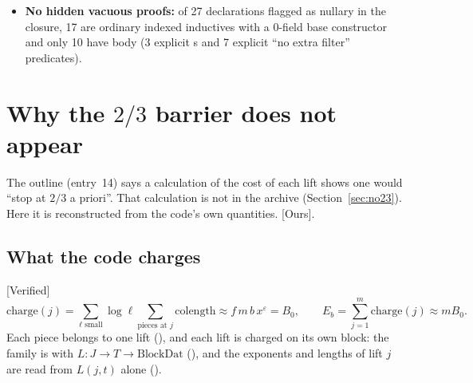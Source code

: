 \documentclass[11pt]{article}
\newcommand{\Verified}{\textcolor{verc}{\textsf{\small[Verified]}}}
\newcommand{\Ours}{\textcolor{oursc}{\textsf{\small[Ours]}}}
\newcommand{\eps}{\varepsilon}
\theoremstyle{plain}
\theoremstyle{definition}
\begin{document}
\begin{itemize}
  (, , , $\sim$1{,}645 declarations,
  unread field  / ; upstream PR~\#384);
  (ii)~the  / Hodge-flag / Pl\"ucker conjunct ($\sim$160+ declarations, unread 4th
  conjunct of ; PR~\#395);
  (iii)~12 classical-theorem fields of  (including
  Stone--von Neumann, metaplectic representation, Kudla splitting, holomorphic discrete series,
  Weyl branching, and cuspidal mirabolic; $\sim$800+ declarations; PR~\#398); or
  (iv)~the full local Langlands correspondence ( is inert; the proof uses
  only the weak assignment  via ).
\item \textbf{No hidden vacuous proofs:} of 27  declarations flagged as nullary in the
  closure, 17 are ordinary indexed inductives with a 0-field base constructor and only 10 have body
   (3 explicit s and 7 explicit ``no extra filter'' predicates).
\end{itemize}

\section{Why the $2/3$ barrier does not appear}\label{sec:23}

The outline (entry~14) says a calculation of the cost of each lift shows one would ``stop at $2/3$ a
priori''. That calculation is not in the archive (Section~\ref{sec:no23}). Here it is reconstructed
from the code's own quantities. \Ours.

\subsection{What the code charges}

\Verified{}
\[
\mathrm{charge}(j)=\sum_{\ell\text{ small}}\log\ell\sum_{\text{pieces at }j}\mathrm{colength}
\approx f\,m\,b\,x^\eps=B_0,\qquad E_b=\sum_{j=1}^m\mathrm{charge}(j)\approx m B_0.
\]
Each piece belongs to one lift (), and each lift is charged on its own block:
the family is  with $L:J\to T\to\mathrm{BlockDat}$ (), and the
exponents and lengths of lift $j$ are read from $L(j,t)$ alone ().
\end{document}
